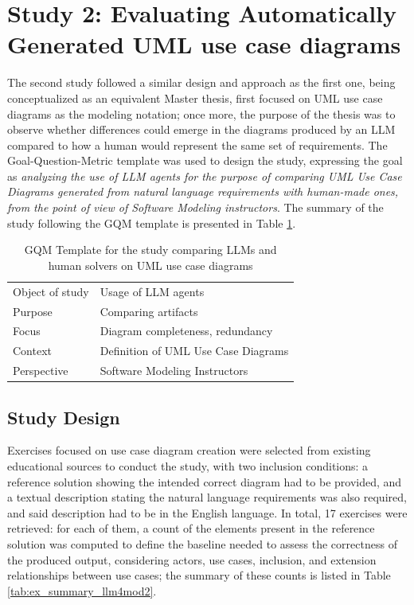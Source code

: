 \section{Study 2: Evaluating Automatically Generated UML use case diagrams}

The second study followed a similar design and approach as the first one, being conceptualized as an equivalent Master thesis, first focused on UML use case diagrams as the modeling notation; once more, the purpose of the thesis was to observe whether differences could emerge in the diagrams produced by an LLM compared to how a human would represent the same set of requirements. The Goal-Question-Metric template was used to design the study, expressing the goal as \textit{analyzing the use of LLM agents for the purpose of comparing UML Use Case Diagrams generated from natural language requirements with human-made ones, from the point of view of Software Modeling instructors}. The summary of the study following the GQM template is presented in Table \ref{tab:llm4mod2_gqm}. 


\begin{table}[ht]
\centering
\small
\caption{GQM Template for the study comparing LLMs and human solvers on UML use case diagrams}
\label{tab:llm4mod2_gqm}
    \begin{tabular}{@{}p{} p{}@{}}
    \toprule
    Object of study & Usage of LLM agents\\
    Purpose & Comparing artifacts\\
    Focus & Diagram completeness, redundancy\\
    Context & Definition of UML Use Case Diagrams\\
    Perspective & Software Modeling Instructors\\
    \bottomrule
    \end{tabular}
\end{table}

\subsection{Study Design}

Exercises focused on use case diagram creation were selected from existing educational sources to conduct the study, with two inclusion conditions: a reference solution showing the intended correct diagram had to be provided, and a textual description stating the natural language requirements was also required, and said description had to be in the English language. In total, 17 exercises were retrieved: for each of them, a count of the elements present in the reference solution was computed to define the baseline needed to assess the correctness of the produced output, considering actors, use cases, inclusion, and extension relationships between use cases; the summary of these counts is listed in Table \ref{tab:ex_summary_llm4mod2}.

